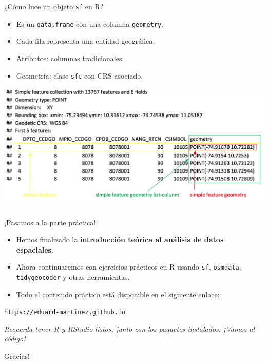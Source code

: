 \documentclass{beamer}
\begin{document}
\begin{frame}{¿Cómo luce un objeto \texttt{sf} en R?}
\begin{itemize}
    \item Es un \texttt{data.frame} con una columna \texttt{geometry}.
    \item Cada fila representa una entidad geográfica.
    \item Atributos: columnas tradicionales.
    \item Geometría: clase \texttt{sfc} con CRS asociado.
\end{itemize}
\centering
\includegraphics[width=0.95\linewidth]{figures/sf_console.png}
\end{frame}

\begin{frame}{¡Pasamos a la parte práctica!}
\vspace{1em}
\begin{itemize}
    \item Hemos finalizado la \textbf{introducción teórica al análisis de datos espaciales}.
    \item Ahora continuaremos con ejercicios prácticos en R usando \texttt{sf}, \texttt{osmdata}, \texttt{tidygeocoder} y otras herramientas.
    \item Todo el contenido práctico está disponible en el siguiente enlace:
\end{itemize}

\vspace{1.5em}
\begin{center}
\Large
\href{https://eduard-martinez.github.io/workshop/gis_in_r/lecture/parte-2.html}{\texttt{https://eduard-martinez.github.io}}
\end{center}

\vspace{1em}
\small
\textit{Recuerda tener R y RStudio listos, junto con los paquetes instalados. ¡Vamos al código!}
\end{frame}

\begin{frame}
    \begin{center}
    \Huge Gracias!
    \end{center}
\end{frame}
\end{document}
